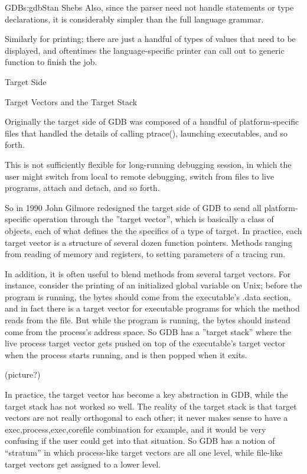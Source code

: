\begin{aosachapter}{GDB}{s:gdb}{Stan Shebs}
Also, since the parser need not handle statements or type declarations,
it is considerably simpler than the full language grammar.

Similarly for printing; there are just a handful of types of values that
need to be displayed, and oftentimes the language-specific printer can
call out to generic function to finish the job.

Target Side

Target Vectors and the Target Stack

Originally the target side of GDB was composed of a handful of
platform-specific files that handled the details of calling ptrace(),
launching executables, and so forth.

This is not sufficiently flexible for long-running debugging session,
in which the user might switch from local to remote debugging, switch
from files to live programs, attach and detach, and so forth.

So in 1990 John Gilmore redesigned the target side of GDB to send all
platform-specific operation through the ''target vector'', which is
basically a class of objects, each of what defines the the specifics
of a type of target.  In practice, each target vector is a structure
of several dozen function pointers.  Methods ranging from reading of
memory and registers, to setting parameters of a tracing run.

In addition, it is often useful to blend methods from several target
vectors.  For instance, consider the printing of an initialized global
variable on Unix; before the program is running, the bytes should come
from the executable's .data section, and in fact there is a target
vector for executable programs for which the method reads from the
file.  But while the program is running, the bytes should instead come
from the process's address space.  So GDB has a ''target stack'' where
the live process target vector gets pushed on top of the executable's
target vector when the process starts running, and is then popped when
it exits.

(picture?)

In practice, the target vector has become a key abstraction in GDB,
while the target stack has not worked so well.  The reality of the
target stack is that target vectors are not really orthogonal to each
other; it never makes sense to have a exec,process,exec,corefile
combination for example, and it would be very confusing if the user
could get into that situation.  So GDB has a notion of ``stratum'' in
which process-like target vectors are all one level, while file-like
target vectors get assigned to a lower level.


\end{aosachapter}

